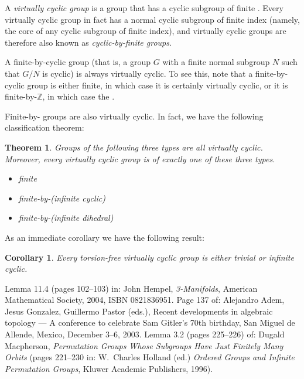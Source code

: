 \documentclass[12pt]{article}
\newtheorem*{thm*}{Theorem}
\newtheorem*{cor*}{Corollary}
\def\Z{\mathbb{Z}}
\begin{document}

A \emph{virtually cyclic group} is 
a group that has a cyclic subgroup of finite .
Every virtually cyclic group in fact 
has a normal cyclic subgroup of finite index
(namely, the core of any cyclic subgroup of finite index),
and virtually cyclic groups are therefore also known as
\emph{cyclic-by-finite groups}.

A finite-by-cyclic group 
(that is, a group $G$ with a finite normal subgroup $N$
such that $G/N$ is cyclic)
is always virtually cyclic.
To see this, note that a finite-by-cyclic group is either finite,
in which case it is certainly virtually cyclic,
or it is finite-by-$\Z$, 
in which case the 
.

Finite-by- groups 
are also virtually cyclic.
In fact, we have the following classification theorem:\cite{hempel}\cite{rdiat}

\begin{thm*}
Groups of the following three types are all virtually cyclic.
Moreover, every virtually cyclic group is of exactly one of these three types.
\begin{itemize}
\item finite
\item finite-by-(infinite cyclic)
\item finite-by-(infinite dihedral)
\end{itemize}
\end{thm*}

As an immediate corollary we have the following result:\cite{macpherson}

\begin{cor*}
Every torsion-free virtually cyclic group is either trivial or infinite cyclic.
\end{cor*}

\begin{thebibliography}{9}
 Lemma 11.4 (pages 102--103) in:
 John Hempel,
 {\it 3-Manifolds},
 American Mathematical Society, 2004,
 ISBN 0821836951.
 Page 137 of:
 Alejandro Adem, Jesus Gonzalez, Guillermo Pastor (eds.),
 Recent developments in algebraic topology --- A conference to celebrate
   Sam Gitler's 70th birthday, San Miguel de Allende, Mexico, December 3--6, 2003.
 Lemma 3.2 (pages 225--226) of:
 Dugald Macpherson,
 {\it Permutation Groups Whose Subgroups Have Just Finitely Many Orbits}
 (pages 221--230 in: W.\ Charles Holland (ed.)
  {\it Ordered Groups and Infinite Permutation Groups},
  Kluwer Academic Publishers, 1996).
\end{thebibliography}
\end{document}
